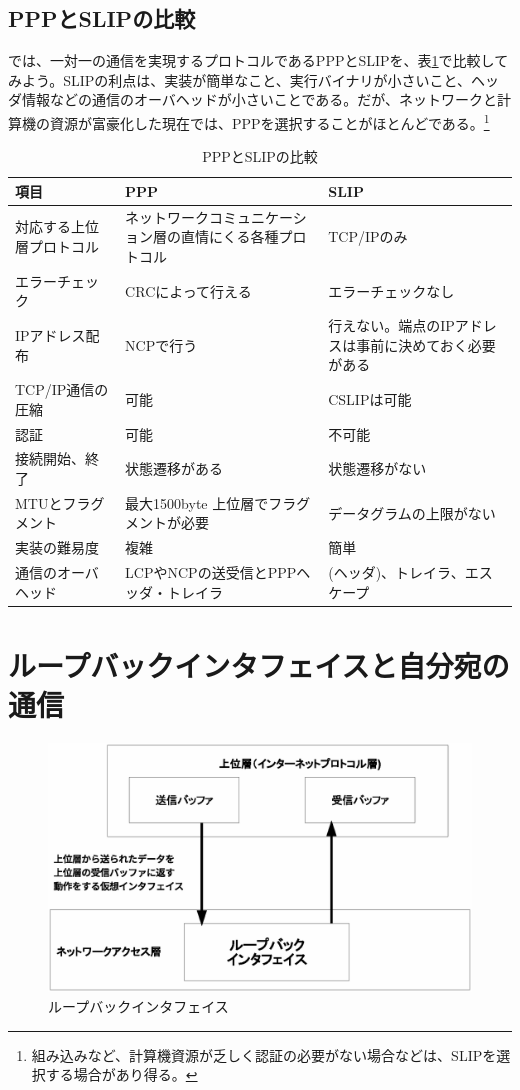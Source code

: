 \subsection{PPPとSLIPの比較}

では、一対一の通信を実現するプロトコルであるPPPとSLIPを、表\ref{pppslip}で比較してみよう。SLIPの利点は、実装が簡単なこと、実行バイナリが小さいこと、ヘッダ情報などの通信のオーバヘッドが小さいことである。だが、ネットワークと計算機の資源が富豪化した現在では、PPPを選択することがほとんどである。\footnote{組み込みなど、計算機資源が乏しく認証の必要がない場合などは、SLIPを選択する場合があり得る。}

\begin{table}[hbtp] \caption{PPPとSLIPの比較} \label{pppslip}
\begin{center}
	\begin{tabularx}{110mm}{lXX} \toprule
		項目 & PPP & SLIP \\ \midrule
		対応する上位層プロトコル & ネットワークコミュニケーション層の直情にくる各種プロトコル  & TCP/IPのみ \\
		エラーチェック & CRCによって行える & エラーチェックなし \\
		IPアドレス配布 & NCPで行う & 行えない。端点のIPアドレスは事前に決めておく必要がある \\
		TCP/IP通信の圧縮 & 可能 & CSLIPは可能 \\
		認証 & 可能 & 不可能 \\
		接続開始、終了 & 状態遷移がある & 状態遷移がない \\
		MTUとフラグメント & 最大1500byte 上位層でフラグメントが必要 & データグラムの上限がない \\
		実装の難易度 & 複雑 & 簡単 \\
		通信のオーバヘッド & LCPやNCPの送受信とPPPヘッダ・トレイラ & (ヘッダ)、トレイラ、エスケープ \\ \bottomrule
	\end{tabularx}
\end{center}
\end{table}

\section{ループバックインタフェイスと自分宛の通信}

\begin{figure}[htbp]
	\includegraphics[width=12cm,clip]{draw/loopback.eps}
	\caption{ループバックインタフェイス}
	\label{fig:loopback}
\end{figure}

